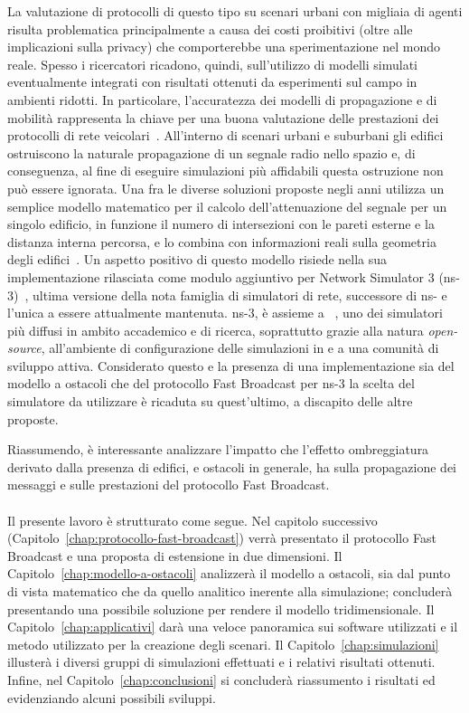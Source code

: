 La valutazione di protocolli di questo tipo su scenari urbani con migliaia di agenti risulta
problematica principalmente a causa dei costi proibitivi (oltre alle implicazioni sulla privacy)
che comporterebbe una sperimentazione nel mondo reale.
Spesso i ricercatori ricadono, quindi, sull'utilizzo di modelli simulati eventualmente integrati con risultati ottenuti
da esperimenti sul campo in ambienti ridotti.
In particolare, l'accuratezza dei modelli di propagazione e di mobilità rappresenta la chiave per una buona valutazione delle prestazioni
dei protocolli di rete veicolari~\cite{4020783}.
All'interno di scenari urbani e suburbani gli edifici ostruiscono la naturale propagazione di un segnale radio nello spazio
e, di conseguenza, al fine di eseguire simulazioni più affidabili questa ostruzione non può essere ignorata.
Una fra le diverse soluzioni proposte negli anni utilizza un semplice modello matematico
per il calcolo dell'attenuazione del segnale per un singolo edificio,
in funzione il numero di intersezioni con le pareti esterne e la distanza interna percorsa,
e lo combina con informazioni reali sulla geometria degli edifici~\cite{Carpenter:2015:OMI:2756509.2756512}.
Un aspetto positivo di questo modello risiede nella sua implementazione rilasciata
come modulo aggiuntivo per Network Simulator 3 (ns-3)~\cite{ns3Website},
ultima versione della nota famiglia di simulatori di rete, successore di ns-
e l'unica a essere attualmente mantenuta.
ns-3, è assieme a \omnet~\cite{omnetWebsite}, uno dei simulatori più diffusi
in ambito accademico e di ricerca, soprattutto grazie alla natura \textit{open-source},
all'ambiente di configurazione delle simulazioni in \Cpp{} e a una comunità di sviluppo attiva.
Considerato questo e la presenza di una implementazione sia del modello a ostacoli
che del protocollo Fast Broadcast per ns-3 la scelta del simulatore da utilizzare
è ricaduta su quest'ultimo, a discapito delle altre proposte.

Riassumendo, è interessante analizzare l'impatto che l'effetto ombreggiatura derivato dalla
presenza di edifici, e ostacoli in generale, ha sulla propagazione dei messaggi e
sulle prestazioni del protocollo Fast Broadcast. %
%
\paragraph{}
Il presente lavoro è strutturato come segue.
Nel capitolo successivo (Capitolo~\ref{chap:protocollo-fast-broadcast}) verrà presentato il protocollo Fast Broadcast e una proposta di estensione in due dimensioni.
Il Capitolo~\ref{chap:modello-a-ostacoli} analizzerà il modello a ostacoli, sia dal punto di vista matematico che da quello analitico inerente alla simulazione;
concluderà presentando una possibile soluzione per rendere il modello tridimensionale.
Il Capitolo~\ref{chap:applicativi} darà una veloce panoramica sui software utilizzati e il metodo utilizzato per la creazione degli scenari.
Il Capitolo~\ref{chap:simulazioni} illusterà i diversi gruppi di simulazioni effettuati e i relativi risultati ottenuti.
Infine, nel Capitolo~\ref{chap:conclusioni}
si concluderà riassumento i risultati ed evidenziando alcuni possibili sviluppi.
%
